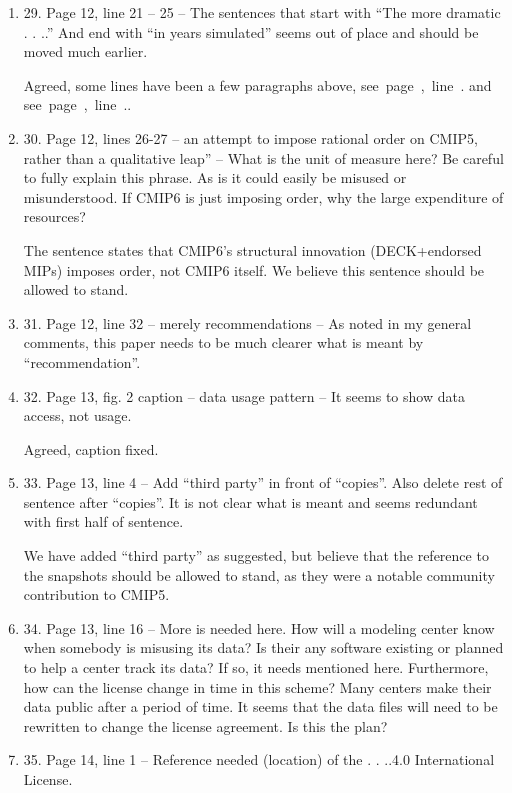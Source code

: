 \documentclass[gmd,manuscript]{copernicus}
\newcommand{\plref}[1]{\mbox{see page \pageref{p-#1}, line
    \lineref{l-#1}.}}
\newenvironment{answer}{\color{blue}}{}
\begin{document}
\begin{enumerate}[label=RC1-\arabic*,leftmargin=*]
  \begin{answer}
    \plref{RC1-27}
  \end{answer}
\item 29. Page 12, line 21 -- 25 -- The sentences that start with “The
  more dramatic . . ..” And end with “in years simulated” seems out of
  place and should be moved much earlier.

  \begin{answer}
    Agreed, some lines have been a few paragraphs above,
    \plref{RC1-29a} and \plref{RC1-29b}.
  \end{answer}
\item 30. Page 12, lines 26-27 -- an attempt to impose rational order
  on CMIP5, rather than a qualitative leap” -- What is the unit of
  measure here? Be careful to fully explain this phrase. As is it
  could easily be misused or misunderstood. If CMIP6 is just imposing
  order, why the large expenditure of resources?

  \begin{answer}
    The sentence states that CMIP6's structural innovation
    (DECK+endorsed MIPs) imposes order, not CMIP6 itself. We believe
    this sentence should be allowed to stand.
  \end{answer}
\item 31. Page 12, line 32 -- merely recommendations -- As noted in my
  general comments, this paper needs to be much clearer what is meant
  by “recommendation”.
\item 32. Page 13, fig. 2 caption -- data usage pattern -- It seems to
  show data access, not usage.

  \begin{answer}
    Agreed, caption fixed.
  \end{answer}
\item 33. Page 13, line 4 -- Add “third party” in front of “copies”.
  Also delete rest of sentence after “copies”. It is not clear what is
  meant and seems redundant with first half of sentence.

  \begin{answer}
    We have added ``third party'' as suggested, but believe that the
    reference to the snapshots should be allowed to stand, as they
    were a notable community contribution to CMIP5.
  \end{answer}
\item 34. Page 13, line 16 -- More is needed here. How will a modeling
  center know when somebody is misusing its data? Is their any
  software existing or planned to help a center track its data? If so,
  it needs mentioned here. Furthermore, how can the license change in
  time in this scheme? Many centers make their data public after a
  period of time. It seems that the data files will need to be
  rewritten to change the license agreement. Is this the plan?
\item 35. Page 14, line 1 -- Reference needed (location) of the . .
  ..4.0 International License.


\end{enumerate}
\end{document}
